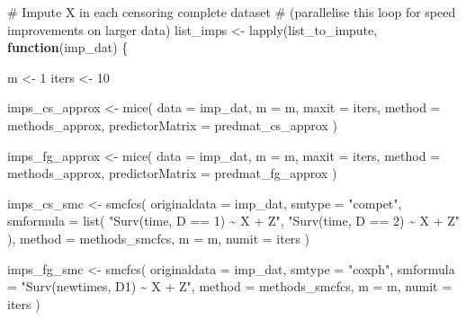 \documentclass[
  12pt,
  a4paper,
]{article}
\newenvironment{Shaded}{\begin{snugshade}}{\end{snugshade}}
\newcommand{\AttributeTok}[1]{\textcolor[rgb]{0.40,0.45,0.13}{#1}}
\newcommand{\CommentTok}[1]{\textcolor[rgb]{0.37,0.37,0.37}{#1}}
\newcommand{\ControlFlowTok}[1]{\textcolor[rgb]{0.00,0.23,0.31}{\textbf{#1}}}
\newcommand{\DecValTok}[1]{\textcolor[rgb]{0.68,0.00,0.00}{#1}}
\newcommand{\FunctionTok}[1]{\textcolor[rgb]{0.28,0.35,0.67}{#1}}
\newcommand{\NormalTok}[1]{\textcolor[rgb]{0.00,0.23,0.31}{#1}}
\newcommand{\OtherTok}[1]{\textcolor[rgb]{0.00,0.23,0.31}{#1}}
\newcommand{\StringTok}[1]{\textcolor[rgb]{0.13,0.47,0.30}{#1}}
\begin{document}
\begin{Shaded}
\begin{Highlighting}[]
\CommentTok{\# Impute X in each censoring complete dataset}
\CommentTok{\# (parallelise this loop for speed improvements on larger data)}
\NormalTok{list\_imps }\OtherTok{\textless{}{-}} \FunctionTok{lapply}\NormalTok{(list\_to\_impute, }\ControlFlowTok{function}\NormalTok{(imp\_dat) \{}

\NormalTok{  m }\OtherTok{\textless{}{-}} \DecValTok{1}
\NormalTok{  iters }\OtherTok{\textless{}{-}} \DecValTok{10}
  
\NormalTok{  imps\_cs\_approx }\OtherTok{\textless{}{-}} \FunctionTok{mice}\NormalTok{(}
    \AttributeTok{data =}\NormalTok{ imp\_dat,}
    \AttributeTok{m =}\NormalTok{ m,}
    \AttributeTok{maxit =}\NormalTok{ iters,}
    \AttributeTok{method =}\NormalTok{ methods\_approx,}
    \AttributeTok{predictorMatrix =}\NormalTok{ predmat\_cs\_approx}
\NormalTok{  )}

\NormalTok{  imps\_fg\_approx }\OtherTok{\textless{}{-}} \FunctionTok{mice}\NormalTok{(}
    \AttributeTok{data =}\NormalTok{ imp\_dat,}
    \AttributeTok{m =}\NormalTok{ m,}
    \AttributeTok{maxit =}\NormalTok{ iters,}
    \AttributeTok{method =}\NormalTok{ methods\_approx,}
    \AttributeTok{predictorMatrix =}\NormalTok{ predmat\_fg\_approx}
\NormalTok{  )}

\NormalTok{  imps\_cs\_smc }\OtherTok{\textless{}{-}} \FunctionTok{smcfcs}\NormalTok{(}
    \AttributeTok{originaldata =}\NormalTok{ imp\_dat,}
    \AttributeTok{smtype =} \StringTok{"compet"}\NormalTok{,}
    \AttributeTok{smformula =} \FunctionTok{list}\NormalTok{(}
      \StringTok{"Surv(time, D == 1) \textasciitilde{} X + Z"}\NormalTok{,}
      \StringTok{"Surv(time, D == 2) \textasciitilde{} X + Z"}
\NormalTok{    ),}
    \AttributeTok{method =}\NormalTok{ methods\_smcfcs,}
    \AttributeTok{m =}\NormalTok{ m,}
    \AttributeTok{numit =}\NormalTok{ iters}
\NormalTok{  )}

\NormalTok{  imps\_fg\_smc }\OtherTok{\textless{}{-}} \FunctionTok{smcfcs}\NormalTok{(}
    \AttributeTok{originaldata =}\NormalTok{ imp\_dat,}
    \AttributeTok{smtype =} \StringTok{"coxph"}\NormalTok{,}
    \AttributeTok{smformula =} \StringTok{"Surv(newtimes, D1) \textasciitilde{} X + Z"}\NormalTok{,}
    \AttributeTok{method =}\NormalTok{ methods\_smcfcs,}
    \AttributeTok{m =}\NormalTok{ m,}
    \AttributeTok{numit =}\NormalTok{ iters}
\NormalTok{  )}


\end{Highlighting}
\end{Shaded}
\end{document}
